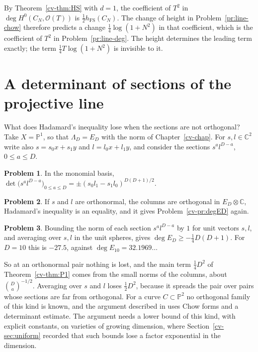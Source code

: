 \documentclass[reqno]{amsart}
\newcounter{chap}
\theoremstyle{definition}
\newtheorem{problem}{Problem}[section]
\theoremstyle{plain}
\newcommand{\C}{\mathbb{C}}
\newcommand{\Pb}{\mathbb{P}}
\newcommand{\hFS}{h_{\mathrm{FS}}}
\begin{document}
By Theorem~\ref{cv-thm:HS} with \(d = 1\), the coefficient of \(T^2\) in \(\deg H^0(C_N, \mathcal O(T))\) is \(\frac12\hFS(C_N)\).  The change of height in Problem~\ref{pr:line-chow} therefore predicts a change \(\frac14\log(1 + N^2)\) in that coefficient, which is the coefficient of \(T^2\) in Problem~\ref{pr:line-deg}.  The height determines the leading term exactly; the term \(\frac14 T\log(1 + N^2)\) is invisible to it.

\section{A determinant of sections of the projective line}\label{sec:check}

What does Hadamard's inequality lose when the sections are not orthogonal?  Take \(X = \Pb^1\), so that \(\Lambda_D = E_D\) with the norm of Chapter~\ref{cv-chap}.  For \(s, l \in \C^2\) write also \(s = s_0x + s_1y\) and \(l = l_0x + l_1y\), and consider the sections \(s^al^{D-a}\), \(0 \le a \le D\).

\begin{problem}\label{pr:P1-det}
In the monomial basis, \(\det\bigl(s^al^{D-a}\bigr)_{0 \le a \le D} = \pm(s_0l_1 - s_1l_0)^{D(D+1)/2}\).
\end{problem}

\begin{problem}\label{pr:P1-exact}
If \(s\) and \(l\) are orthonormal, the columns are orthogonal in \(E_D \otimes \C\), Hadamard's inequality is an equality, and it gives Problem~\ref{cv-pr:degED} again.
\end{problem}

\begin{problem}\label{pr:P1-average}
Bounding the norm of each section \(s^al^{D-a}\) by \(1\) for unit vectors \(s, l\), and averaging over \(s, l\) in the unit spheres, gives \(\deg E_D \ge -\frac14 D(D+1)\).  For \(D = 10\) this is \(-27.5\), against \(\deg E_{10} = 32.1969\ldots\)
\end{problem}

So at an orthonormal pair nothing is lost, and the main term \(\frac14D^2\) of Theorem~\ref{cv-thm:P1} comes from the small norms of the columns, about \(\binom{D}{a}^{-1/2}\).  Averaging over \(s\) and \(l\) loses \(\frac12 D^2\), because it spreads the pair over pairs whose sections are far from orthogonal.  For a curve \(C \subset \Pb^2\) no orthogonal family of this kind is known, and the argument described in \cite[proof dependency map, item HSAt]{Adr} uses Chow forms and a determinant estimate.  The argument needs a lower bound of this kind, with explicit constants, on varieties of growing dimension, where Section~\ref{cv-sec:uniform} recorded that such bounds lose a factor exponential in the dimension.
\end{document}
